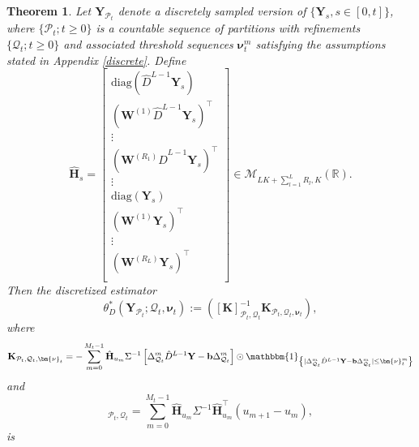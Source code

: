 \documentclass[12pt]{amsart}
\newtheorem{theorem}{Theorem}[section]
\numberwithin{equation}{section}
\newcommand{\1}{\mathbf{1}}
\begin{document}
\begin{theorem}
\label{thm2}
Let $\mathbf{Y}_{\mathcal{P}_t}$ denote a discretely sampled version of $\{\mathbf{Y}_s,s\in[0,t]\}$, where $\{\mathcal{P}_t;t\geq 0\}$ is a countable sequence of partitions with refinements $\{\mathcal{Q}_t;t\geq 0\}$ and associated threshold sequences $\bm{\nu}^m_t$ satisfying the assumptions stated in Appendix \ref{discrete}. Define
\begin{equation*}
    \hat{\mathbf{H}}_s = \begin{bmatrix}
    \mathrm{diag}\left(\hat{D}^{L-1}\mathbf{Y}_{s}\right)\\
    (\mathbf{W}^{(1)}\hat{D}^{L-1}\mathbf{Y}_{s})^{\top}\\
    \vdots\\
    (\mathbf{W}^{(R_1)}\hat{D}^{L-1}\mathbf{Y}_{s})^{\top}\\
    \vdots\\
    \mathrm{diag}\left(\mathbf{Y}_{s}\right)\\
    (\mathbf{W}^{(1)}\mathbf{Y}_{s})^{\top}\\
    \vdots\\
    (\mathbf{W}^{(R_L)}\mathbf{Y}_{s})^{\top}\\
    \end{bmatrix}\in\mathcal{M}_{LK+\sum_{l=1}^LR_l,K}(\mathbb{R}).
\end{equation*}
Then the discretized estimator
    \begin{equation*}
    \theta_D^*\left(\mathbf{Y}_{\mathcal{P}_t};\mathcal{Q}_t,\bm{\nu}_t\right):= \left([\mathbf{K}]^{-1}_{\mathcal{P}_t,\mathcal{Q}_t}\mathbf{K}_{\mathcal{P}_t,\mathcal{Q}_t,\bm{\nu}_t}\right),     
    \end{equation*}
    where
    \begin{equation*}
\mathbf{K}_{\mathcal{P}_t,\mathcal{Q}_t,\bm{\nu}_t}=-\sum_{m=0}^{M_t-1}\hat{\mathbf{H}}_{u_m} \Sigma^{-1}\left[\Delta^m_{\mathcal{Q}_t}\hat{D}^{L-1}\mathbf{Y}-\mathbf{b}\Delta^m_{\mathcal{Q}_t}\right]\odot\mathbbm{1}_{\left\lbrace \vert \Delta^m_{\mathcal{Q}_t}\hat{D}^{L-1}\mathbf{Y}-\mathbf{b}\Delta^m_{\mathcal{Q}_t}\vert\leq\bm{\nu}^m_t\right\rbrace}
    \end{equation*} and
    \begin{equation*}
        [\mathbf{K}]_{\mathcal{P}_t,\mathcal{Q}_t}=\sum_{m=0}^{M_t-1}\hat{\mathbf{H}}_{u_m}\Sigma^{-1}\hat{\mathbf{H}}_{u_m}^{\top}(u_{m+1}-u_m),
    \end{equation*}
is
    \begin{itemize}

\end{itemize}
\end{theorem}
\end{document}
